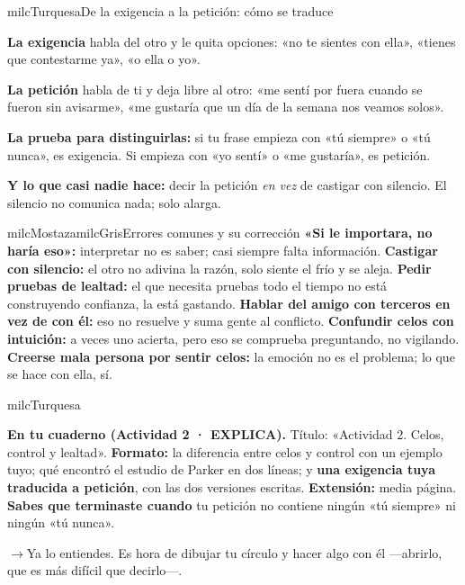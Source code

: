 \documentclass[11pt,letterpaper]{article}
\newcommand{\puente}[1]{%
  \begin{puentebox}%
    \textcolor{milcGradeDark}{$\rightarrow$}\hspace{2mm}#1%
  \end{puentebox}%
}
\begin{document}
\begin{drawbox}{milcTurquesa}{De la exigencia a la petición: cómo se traduce}
\begin{pasoslista}
\item \textbf{La exigencia} habla del otro y le quita opciones: «no te sientes con ella», «tienes que contestarme ya», «o ella o yo».
\item \textbf{La petición} habla de ti y deja libre al otro: «me sentí por fuera cuando se fueron sin avisarme», «me gustaría que un día de la semana nos veamos solos».
\item \textbf{La prueba para distinguirlas:} si tu frase empieza con «tú siempre» o «tú nunca», es exigencia. Si empieza con «yo sentí» o «me gustaría», es petición.
\item \textbf{Y lo que casi nadie hace:} decir la petición \emph{en vez} de castigar con silencio. El silencio no comunica nada; solo alarga.
\end{pasoslista}
\end{drawbox}

\begin{softbox}{milcMostaza}{milcGris}{Errores comunes y su corrección}
\textbf{«Si le importara, no haría eso»:} interpretar no es saber; casi siempre falta información. \textbf{Castigar con silencio:} el otro no adivina la razón, solo siente el frío y se aleja. \textbf{Pedir pruebas de lealtad:} el que necesita pruebas todo el tiempo no está construyendo confianza, la está gastando. \textbf{Hablar del amigo con terceros en vez de con él:} eso no resuelve y suma gente al conflicto. \textbf{Confundir celos con intuición:} a veces uno acierta, pero eso se comprueba preguntando, no vigilando. \textbf{Creerse mala persona por sentir celos:} la emoción no es el problema; lo que se hace con ella, sí.
\end{softbox}

\begin{infoband}{milcTurquesa}


\textbf{En tu cuaderno (Actividad 2 · EXPLICA).} Título: «Actividad 2. Celos, control y lealtad». \textbf{Formato:} la diferencia entre celos y control con un ejemplo tuyo; qué encontró el estudio de Parker en dos líneas; y \textbf{una exigencia tuya traducida a petición}, con las dos versiones escritas. \textbf{Extensión:} media página. \textbf{Sabes que terminaste cuando} tu petición no contiene ningún «tú siempre» ni ningún «tú nunca».
\end{infoband}

\puente{Ya lo entiendes. Es hora de dibujar tu círculo y hacer algo con él ---abrirlo, que es más difícil que decirlo---.}
\end{document}
